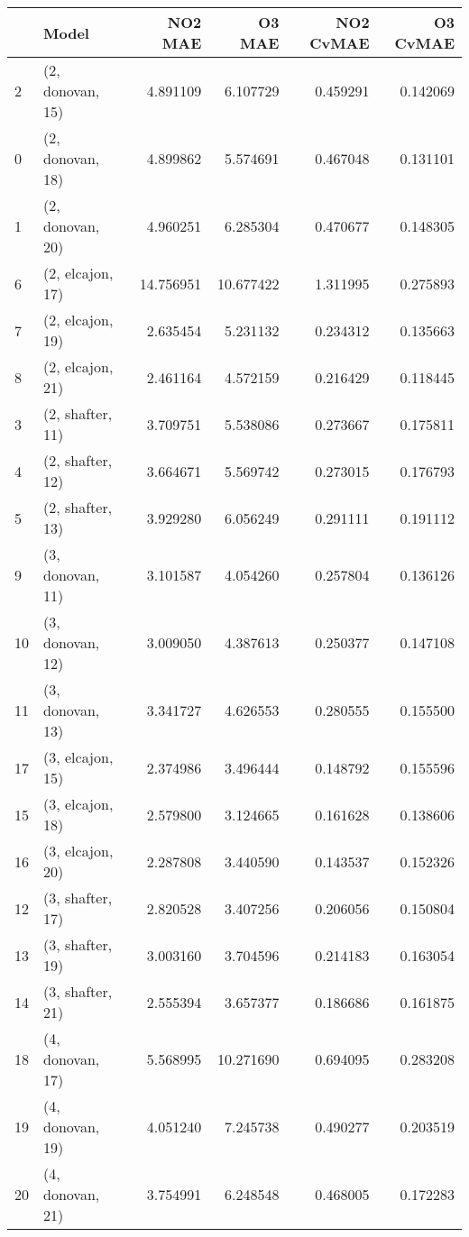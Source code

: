 \begin{tabular}{llrrrr}
\toprule
{} &             Model &    NO2 MAE &     O3 MAE &  NO2 CvMAE &  O3 CvMAE \\
\midrule
2  &  (2, donovan, 15) &   4.891109 &   6.107729 &   0.459291 &  0.142069 \\
0  &  (2, donovan, 18) &   4.899862 &   5.574691 &   0.467048 &  0.131101 \\
1  &  (2, donovan, 20) &   4.960251 &   6.285304 &   0.470677 &  0.148305 \\
6  &  (2, elcajon, 17) &  14.756951 &  10.677422 &   1.311995 &  0.275893 \\
7  &  (2, elcajon, 19) &   2.635454 &   5.231132 &   0.234312 &  0.135663 \\
8  &  (2, elcajon, 21) &   2.461164 &   4.572159 &   0.216429 &  0.118445 \\
3  &  (2, shafter, 11) &   3.709751 &   5.538086 &   0.273667 &  0.175811 \\
4  &  (2, shafter, 12) &   3.664671 &   5.569742 &   0.273015 &  0.176793 \\
5  &  (2, shafter, 13) &   3.929280 &   6.056249 &   0.291111 &  0.191112 \\
9  &  (3, donovan, 11) &   3.101587 &   4.054260 &   0.257804 &  0.136126 \\
10 &  (3, donovan, 12) &   3.009050 &   4.387613 &   0.250377 &  0.147108 \\
11 &  (3, donovan, 13) &   3.341727 &   4.626553 &   0.280555 &  0.155500 \\
17 &  (3, elcajon, 15) &   2.374986 &   3.496444 &   0.148792 &  0.155596 \\
15 &  (3, elcajon, 18) &   2.579800 &   3.124665 &   0.161628 &  0.138606 \\
16 &  (3, elcajon, 20) &   2.287808 &   3.440590 &   0.143537 &  0.152326 \\
12 &  (3, shafter, 17) &   2.820528 &   3.407256 &   0.206056 &  0.150804 \\
13 &  (3, shafter, 19) &   3.003160 &   3.704596 &   0.214183 &  0.163054 \\
14 &  (3, shafter, 21) &   2.555394 &   3.657377 &   0.186686 &  0.161875 \\
18 &  (4, donovan, 17) &   5.568995 &  10.271690 &   0.694095 &  0.283208 \\
19 &  (4, donovan, 19) &   4.051240 &   7.245738 &   0.490277 &  0.203519 \\
20 &  (4, donovan, 21) &   3.754991 &   6.248548 &   0.468005 &  0.172283 \\

\end{tabular}
